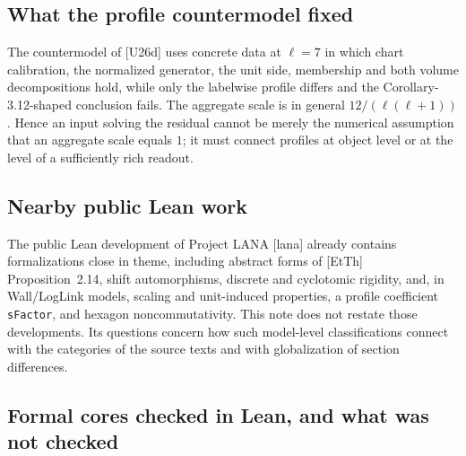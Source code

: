 \documentclass[11pt]{article}
\theoremstyle{definition}
\begin{document}
\subsection{What the profile countermodel fixed}

The countermodel of [U26d] uses concrete data at $\ell=7$ in
which chart calibration, the normalized generator, the unit side,
membership and both volume decompositions hold, while only the
labelwise profile differs and the Corollary-3.12-shaped
conclusion fails.  The aggregate scale is in general
$12/(\ell(\ell+1))$.  Hence an input solving the residual cannot
be merely the numerical assumption that an aggregate scale equals
$1$; it must connect profiles at object level or at the level of
a sufficiently rich readout.

\subsection{Nearby public Lean work}

The public Lean development of Project LANA [lana] already contains
formalizations close in theme, including abstract forms of
[EtTh] Proposition~2.14, shift automorphisms, discrete and
cyclotomic rigidity, and, in Wall/LogLink models, scaling and
unit-induced properties, a profile coefficient \texttt{sFactor},
and hexagon noncommutativity.  This note does not restate those
developments.  Its questions concern how such model-level
classifications connect with the categories of the source texts
and with globalization of section differences.

\subsection{Formal cores checked in Lean, and what was not checked}\label{ss:cores}
\end{document}
